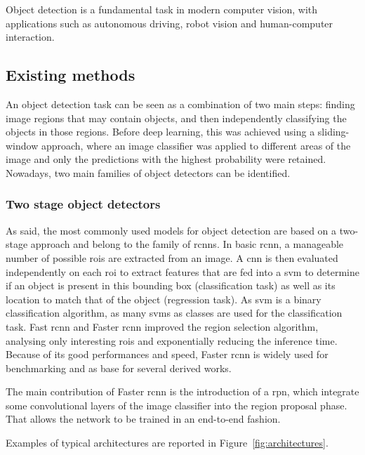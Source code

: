 \documentclass[%
    corpo=12pt,
    twoside,
    stile=classica,   
    tipotesi=magistrale,
    evenboxes,
    english,
	numerazioneromana,
]{toptesi}
\begin{document}
Object detection is a fundamental task in modern computer vision, with applications such as autonomous driving, robot vision and human-computer interaction.

\subsection{Existing methods}\label{sec:detectors}
An object detection task can be seen as a combination of two main steps: finding image regions that may contain objects, and then independently classifying the objects in those regions. Before deep learning, this was achieved using a sliding-window approach, where an image classifier was applied to different areas of the image and only the predictions with the highest probability were retained. Nowadays, two main families of object detectors can be identified.

\subsubsection{Two stage object detectors}
As said, the most commonly used models for object detection are based on a two-stage approach and belong to the family of \glspl{rcnn}. In basic \acrshort{rcnn}\cite{girshick2014rich}, a manageable number of possible \glspl{roi} are extracted from an image. A \gls{cnn} is then evaluated independently on each \acrshort{roi} to extract features that are fed into a \gls{svm}
to determine if an object is present in this bounding box (classification task) as well as its location to match that of the object (regression task). As \gls{svm} is a binary classification algorithm, as many \glspl{svm} as classes are used for the classification task.
Fast \acrshort{rcnn}\cite{girshick2015fast} and Faster \acrshort{rcnn}\cite{ren2016faster} improved the region selection algorithm, analysing only interesting \glspl{roi} and exponentially reducing the inference time. Because of its good performances and speed, Faster \acrshort{rcnn} is widely used for benchmarking and as base for several derived works.

The main contribution of Faster \acrshort{rcnn} is the introduction of a \gls{rpn}, which integrate some convolutional layers of the image classifier into the region proposal phase. That allows the network to be trained in an end-to-end fashion.

Examples of typical architectures are reported in Figure~\ref{fig:architectures}.
\end{document}
